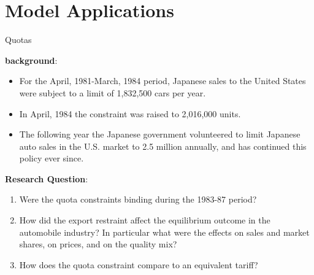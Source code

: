 \documentclass{beamer}
\begin{document}
\section{Model Applications}
\begin{frame}[shrink]
	\transfade %
	\tableofcontents[sectionstyle=show/shaded,subsectionstyle=show/shaded/hide]
	\addtocounter{framenumber}{-1}
\end{frame}
\begin{frame}{Quotas}

	\textbf{background}:
	
	\begin{itemize}
	   \item  For the April, 1981-March, 1984 period, Japanese sales to the United States were subject to a limit of 1,832,500 cars per year.
	   \item  In April, 1984 the constraint was raised to 2,016,000 units.
	   \item The following year the Japanese government volunteered to limit Japanese auto sales in the U.S. market to 2.5 million annually, and has continued this policy ever since.
	\end{itemize}

	\textbf{Research Question}:
	\begin{enumerate}
	   \item Were the quota constraints binding during the 1983-87 period?
	   \item How did the export restraint affect the equilibrium outcome in the automobile industry? In particular what were the effects on sales and market shares, on prices, and on the quality mix?
	   \item How does the quota constraint compare to an equivalent tariff?
   \end{enumerate}
   
\end{frame}	
\end{document}
